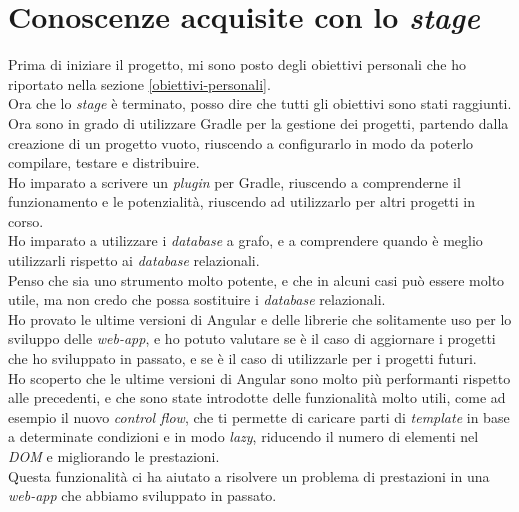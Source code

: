 \section{Conoscenze acquisite con lo \textit{stage}}
Prima di iniziare il progetto, mi sono posto degli obiettivi personali che ho riportato nella sezione \ref{obiettivi-personali}.\\
Ora che lo \textit{stage} è terminato, posso dire che tutti gli obiettivi sono stati raggiunti.\\
Ora sono in grado di utilizzare Gradle per la gestione dei progetti, partendo dalla creazione di un progetto vuoto,
riuscendo a configurarlo in modo da poterlo compilare, testare e distribuire.\\
Ho imparato a scrivere un \textit{plugin} per Gradle, riuscendo a comprenderne il funzionamento e le potenzialità, riuscendo
ad utilizzarlo per altri progetti in corso.\\
Ho imparato a utilizzare i \textit{database} a grafo, e a comprendere quando è meglio utilizzarli rispetto ai \textit{database} relazionali.\\
Penso che sia uno strumento molto potente, e che in alcuni casi può essere molto utile, ma non credo che possa sostituire i \textit{database} relazionali.\\
Ho provato le ultime versioni di Angular e delle librerie che solitamente uso per lo sviluppo delle \textit{web-app}, 
e ho potuto valutare se è il caso di aggiornare i progetti che ho sviluppato in passato, e se è il caso di utilizzarle per i progetti futuri.\\
Ho scoperto che le ultime versioni di Angular sono molto più performanti rispetto alle precedenti, e che sono state introdotte delle funzionalità
molto utili, come ad esempio il nuovo \textit{control flow}, che ti permette di caricare parti di \textit{template} in base a determinate condizioni e in 
modo \textit{lazy}, riducendo il numero di elementi nel \textit{DOM} e migliorando le prestazioni.\\
Questa funzionalità ci ha aiutato a risolvere un problema di prestazioni in una \textit{web-app} che abbiamo sviluppato in passato.\\